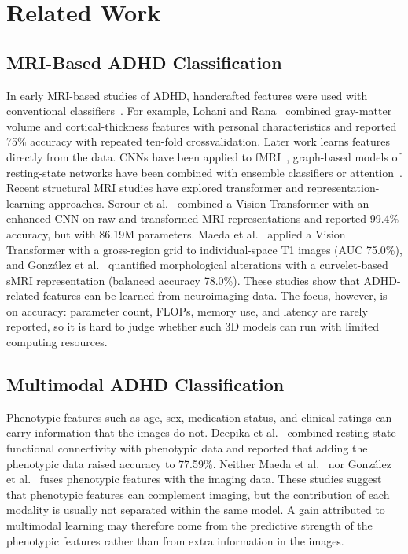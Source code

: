 \documentclass[runningheads]{llncs}
\begin{document}
\section{Related Work}

\subsection{MRI-Based ADHD Classification}
In early MRI-based studies of ADHD, handcrafted features were used with conventional classifiers~\cite{zhangjames2023,tian2024review,lohani2025review}. For example, Lohani and Rana~\cite{lohani2023} combined gray-matter volume and cortical-thickness features with personal characteristics and reported 75\% accuracy with repeated ten-fold cross\-validation. Later work learns features directly from the data. CNNs have been applied to fMRI~\cite{firouzi2024,gulhan2025}, graph-based models of resting-state networks have been combined with ensemble classifiers or attention~\cite{zamanzadeh2024,wu2025hagcn}. Recent structural MRI studies have explored transformer and representation-learning approaches. Sorour et al.~\cite{sorour2026} combined a Vision Transformer with an enhanced CNN on raw and transformed MRI representations and reported 99.4\% accuracy, but with 86.19M parameters. Maeda et al.~\cite{maeda2026} applied a Vision Transformer with a gross-region grid to individual-space T1 images (AUC 75.0\%), and Gonz\'alez et al.~\cite{gonzalez2026} quantified morphological alterations with a curvelet-based sMRI representation (balanced accuracy 78.0\%). These studies show that ADHD-related features can be learned from neuroimaging data. The focus, however, is on accuracy: parameter count, FLOPs, memory use, and latency are rarely reported, so it is hard to judge whether such 3D models can run with limited computing resources.

\subsection{Multimodal ADHD Classification}
Phenotypic features such as age, sex, medication status, and clinical ratings can carry information that the images do not. Deepika et al.~\cite{deepika2024} combined resting-state functional connectivity with phenotypic data and reported that adding the phenotypic data raised accuracy to 77.59\%. Neither Maeda et al.~\cite{maeda2026} nor Gonz\'alez et al.~\cite{gonzalez2026} fuses phenotypic features with the imaging data.
 These studies suggest that phenotypic features can complement imaging, but the contribution of each modality is usually not separated within the same model. A gain attributed to multimodal learning may therefore come from the predictive strength of the phenotypic features rather than from extra information in the images.
\end{document}
